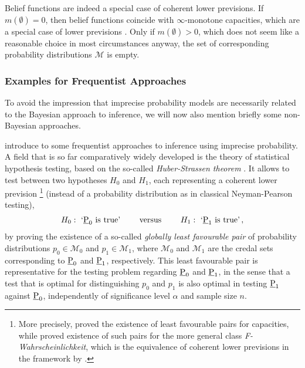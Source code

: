 Belief functions are indeed a special case of coherent lower previsions.
If $m(\emptyset) = 0$, then belief functions coincide with $\infty$-monotone capacities,
which are a special case of lower previsions \parencite[e.g.,][\S 2.1]{itip-other}.
Only if $m(\emptyset) > 0$, which does not seem like a reasonable choice in most circumstances anyway,
the set of corresponding probability distributions $\mathcal{M}$ is empty.


\subsubsection{Examples for Frequentist Approaches}
\label{sec:frequentist}

To avoid the impression that imprecise probability models are necessarily related
to the Bayesian approach to inference,
we will now also mention briefly some non-Bayesian approaches.

\textcite[\S 5]{itip-statinf} introduce to some frequentist approaches to inference using imprecise probability.
A field that is so far comparatively widely developed
is the theory of statistical hypothesis testing,
based on the so-called \emph{Huber-Strassen theorem} \parencite[Theorem~4.1]{1973:huberstrassen}.
It allows to test between two hypotheses $H_0$ and $H_1$,
each representing a coherent lower prevision%
\footnote{More precisely, \textcite{1973:huberstrassen} proved the existence of least favourable pairs
for capacities, while \textcite{1998:augustin} proved existence of such pairs
for the more general class \emph{F-Wahrscheinlichkeit},
which is the equivalence of coherent lower previsions in the framework by \textcite{2001:weichselberger}.}
(instead of a probability distribution as in classical Neyman-Pearson testing),
\begin{align*}
H_0:\ `\underline{\operatorname{P}}_0 \text{ is true'  \qquad versus \qquad } H_1:\   `\underline{\operatorname{P}}_1 \text{ is true'}\,,
\end{align*}
by proving the existence of a so-called \emph{globally least favourable pair}
of probability distributions $p_0 \in \mathcal{M}_0$ and $p_1 \in \mathcal{M}_1$,
where $\mathcal{M}_0$ and $\mathcal{M}_1$ are the credal sets
corresponding to $\underline{\operatorname{P}}_0$ and $\underline{\operatorname{P}}_1$, respectively.
This least favourable pair is representative for the testing problem regarding $\underline{\operatorname{P}}_0$ and $\underline{\operatorname{P}}_1$,
in the sense that a test that is optimal for distinguishing $p_0$ and $p_1$
is also optimal in testing $\underline{\operatorname{P}}_1$ against $\underline{\operatorname{P}}_0$,
independently of significance level $\alpha$ and sample size $n$.


